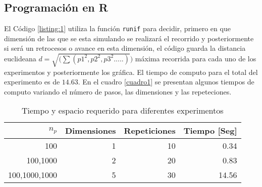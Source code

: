 \documentclass{article}
\begin{document}
\subsection{Programación en R}
El  Código \ref{listing:1} utiliza la función  \texttt{runif} para decidir, primero en que dimensión de las que se esta simulando se realizará el recorrido y posteriormente si será un retrocesos o avance en esta dimensión, el código guarda la distancia euclideana $d=\sqrt{(\sum(p1^2,p2^2,p3^2.....)})$ máxima recorrida  para cada uno de los experimentos y posteriormente los gráfica. El tiempo de computo para el total del experimento es de $14.63$. En el cuadro \ref{cuadro1} se presentan algunos tiempos de computo variando el número de pasos, las dimensiones y las repeteciones.

\begin{table}[]
\centering
\caption{Tiempo y espacio requerido para diferentes experimentos}
\label{tabla 1}
\begin{tabular}{|r|r|r|r|}
\hline
\textbf{$n_p$} & \textbf{Dimensiones} & \textbf{Repeticiones} & \textbf{Tiempo {[}Seg{]}} \\ \hline
100            & 1                    & 10                    & 0.34                      \\ \hline
100,1000       & 2                    & 20                    & 0.83                      \\ \hline
100,1000,1000  & 5                    & 30                    & 14.56                     \\ \hline        
\end{tabular}
\end{table}
\lstset{language=Python}
\lstset{frame=lines}
\lstset{basicstyle=\footnotesize}
\end{document}
